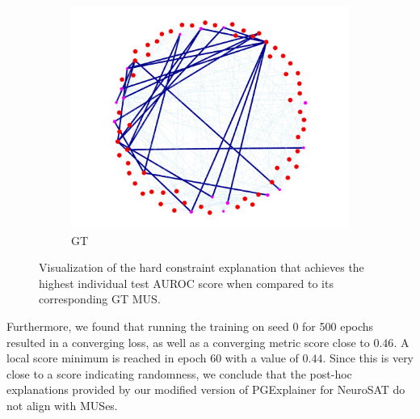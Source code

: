 \begin{figure}[h]
\begin{subfigure}[b]{0.3\textwidth}
        \label{fig:hard_shared}
    \end{subfigure}
    \begin{subfigure}[b]{0.3\textwidth}
        \includegraphics[width=\linewidth]{img/SAT-hard/2025-05-14 20_53_57-seed0_highestAUC_gt_TEST.html.png}
        \caption{\ac{GT}}
        \label{fig:hard_gt}
    \end{subfigure}
    \caption[Visualization of the best hard constraint explanation]{Visualization of the hard constraint explanation that achieves the highest individual test AUROC score when compared to its corresponding \ac{GT} MUS.}
    \label{fig:hard_quant}
\end{figure}

Furthermore, we found that running the training on seed 0 for 500 epochs resulted in a converging loss, as well as a converging metric score close to $0.46$. A local score minimum is reached in epoch 60 with a value of $0.44$. Since this is very close to a score indicating randomness, we conclude that the post-hoc explanations provided by our modified version of PGExplainer for NeuroSAT do not align with MUSes.
